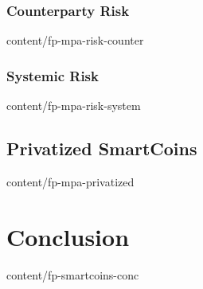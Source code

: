\documentclass{btswhitepaper}
\begin{document}
\subsubsection { Counterparty Risk                                }  { content/fp-mpa-risk-counter       } 
\subsubsection { Systemic Risk                                    }  { content/fp-mpa-risk-system        } 
\subsection    { Privatized SmartCoins                            }  { content/fp-mpa-privatized         } 


\section        { Conclusion                                       }  { content/fp-smartcoins-conc     }


\end{document}
